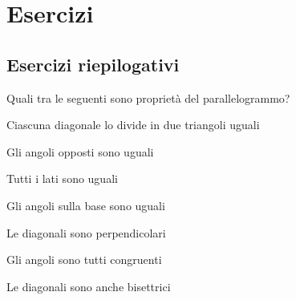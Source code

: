 
\section{Esercizi}

\subsection{Esercizi riepilogativi}

\begin{esercizio}
\label{ese:4.1}
Quali tra le seguenti sono proprietà del parallelogrammo?
\begin{enumeratea}
\item Ciascuna diagonale lo divide in due triangoli 
uguali\hfill\boxV\quad\boxF
\item Gli angoli opposti sono uguali\hfill\boxV\quad\boxF
\item Tutti i lati sono uguali\hfill\boxV\quad\boxF
\item Gli angoli sulla base sono uguali\hfill\boxV\quad\boxF
\item Le diagonali sono perpendicolari\hfill\boxV\quad\boxF
\item Gli angoli sono tutti congruenti\hfill\boxV\quad\boxF
\item Le diagonali sono anche bisettrici\hfill\boxV\quad\boxF
\end{enumeratea}
\end{esercizio}

